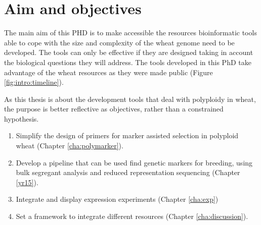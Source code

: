 





\section{Aim and objectives}


The main aim of this PHD is to make accessible the resources bioinformatic tools able to cope with the size and complexity of the wheat genome need to be developed.
The tools can only be effective if they are designed taking in account the biological questions they will address. The tools developed in this PhD take advantage of the wheat resources as they were made public (Figure \ref{fig:intro:timeline}).  

As this thesis is about the development tools that deal with polyploidy in wheat, the purpose is better reflective as objectives, rather than a constrained hypothesis.


\begin{enumerate}

\item Simplify the design of primers for marker assisted selection in polyploid wheat (Chapter \ref{cha:polymarker}).
\item Develop a pipeline that can be used find genetic markers for breeding, using bulk segregant analysis and reduced representation sequencing (Chapter \ref{yr15}).
\item Integrate and display expression experiments (Chapter \ref{cha:exp})
\item Set a framework to integrate different resources (Chapter \ref{cha:discussion}).
\end{enumerate}

